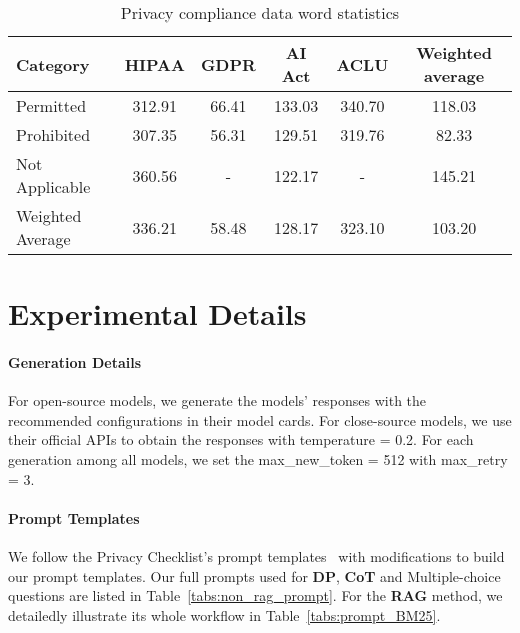 \begin{table*}[t]
\small
    \centering
    \begin{tabular}{l|c|c|c|c|c}
        \toprule
        \textbf{Category} & \textbf{HIPAA} & \textbf{GDPR} & \textbf{AI Act} & \textbf{ACLU} & \textbf{Weighted average} \\
        \midrule
        Permitted & 312.91 & 66.41 & 133.03 & 340.70 & 118.03 \\
        Prohibited & 307.35 & 56.31 & 129.51 & 319.76 & 82.33 \\
        Not Applicable & 360.56 & - & 122.17 & - & 145.21 \\
        \midrule
        Weighted Average & 336.21 & 58.48 & 128.17 & 323.10 & 103.20 \\
        \bottomrule
    \end{tabular}
    \vspace{-0.1in}
    \caption{Privacy compliance data word statistics}
\label{tab:data_word_count}
\vspace{-0.1in}
\end{table*}



\section{Experimental Details}


\paragraph{Generation Details}
For open-source models, we generate the models' responses with the recommended configurations in their model cards.
For close-source models, we use their official APIs to obtain the responses with temperature = 0.2.
For each generation among all models, we set the max\_new\_token = 512 with max\_retry = 3.



\paragraph{Prompt Templates}

We follow the Privacy Checklist's prompt templates~\cite{li-2024-privacychecklist} with modifications to build our prompt templates.
Our full prompts used for \textbf{DP}, \textbf{CoT} and Multiple-choice questions are listed in Table~\ref{tabs:non_rag_prompt}.
For the \textbf{RAG} method, we detailedly illustrate its whole workflow in Table~\ref{tabs:prompt_BM25}.


